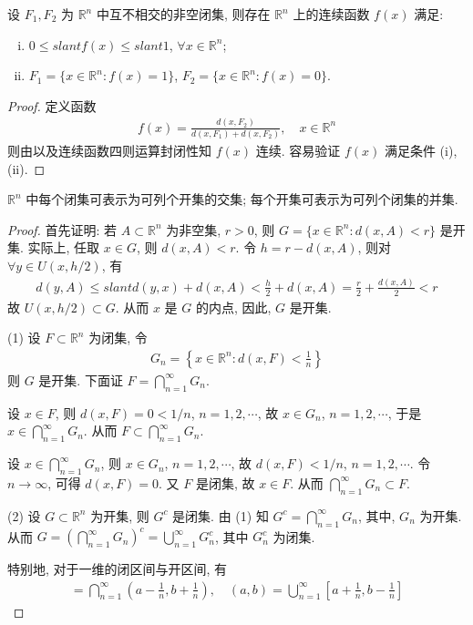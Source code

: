 \documentclass[../../main.tex]{subfiles}
\begin{document}
\begin{proposition}
设 $F_1, F_2$ 为 $\mathbb{R}^n$ 中互不相交的非空闭集, 则存在 $\mathbb{R}^n$ 上的连续函数 $f(x)$ 满足:
\begin{enumerate}[(i)]
\item $0 \leqslant slant f(x) \leqslant slant 1$, $\forall x \in \mathbb{R}^n$;
\item $F_1 = \{x \in \mathbb{R}^n : f(x) = 1\}$, $F_2 = \{x \in \mathbb{R}^n : f(x) = 0\}$.
\end{enumerate}
\end{proposition}
\begin{proof}
定义函数
\begin{align*}
f(x) = \frac{d(x, F_2)}{d(x, F_1) + d(x, F_2)}, \quad x \in \mathbb{R}^n
\end{align*}
则由以及连续函数四则运算封闭性知 $f(x)$ 连续. 容易验证 $f(x)$ 满足条件 (i), (ii).
\end{proof}
  
\begin{proposition}
$\mathbb{R}^n$ 中每个闭集可表示为可列个开集的交集; 每个开集可表示为可列个闭集的并集.
\end{proposition}
\begin{proof}
首先证明: 若 $A \subset \mathbb{R}^n$ 为非空集, $r > 0$, 则 $G = \{x \in \mathbb{R}^n : d(x, A) < r\}$ 是开集. 实际上, 任取 $x \in G$, 则 $d(x, A) < r$. 令 $h = r - d(x, A)$, 则对 $\forall y \in U(x, h/2)$, 有
\begin{align*}
d(y, A) \leqslant slant d(y, x) + d(x, A) < \frac{h}{2} + d(x, A) = \frac{r}{2} + \frac{d(x, A)}{2} < r
\end{align*}
故 $U(x, h/2) \subset G$. 从而 $x$ 是 $G$ 的内点, 因此, $G$ 是开集.

(1) 设 $F \subset \mathbb{R}^n$ 为闭集, 令
\begin{align*}
G_n = \left\{x \in \mathbb{R}^n : d(x, F) < \frac{1}{n}\right\}
\end{align*}
则 $G$ 是开集. 下面证 $F = \bigcap_{n = 1}^{\infty} G_n$.

设 $x \in F$, 则 $d(x, F) = 0 < 1/n$, $n = 1, 2, \cdots$, 故 $x \in G_n$, $n = 1, 2, \cdots$, 于是 $x \in \bigcap_{n = 1}^{\infty} G_n$. 从而 $F \subset \bigcap_{n = 1}^{\infty} G_n$.

设 $x \in \bigcap_{n = 1}^{\infty} G_n$, 则 $x \in G_n$, $n = 1, 2, \cdots$, 故 $d(x, F) < 1/n$, $n = 1, 2, \cdots$. 令 $n \to \infty$, 可得 $d(x, F) = 0$. 又 $F$ 是闭集, 故 $x \in F$. 从而 $\bigcap_{n = 1}^{\infty} G_n \subset F$.

(2) 设 $G \subset \mathbb{R}^n$ 为开集, 则 $G^c$ 是闭集. 由 (1) 知 $G^c = \bigcap_{n = 1}^{\infty} G_n$, 其中, $G_n$ 为开集. 从而 $G = \left(\bigcap_{n = 1}^{\infty} G_n\right)^c = \bigcup_{n = 1}^{\infty} G_n^c$, 其中 $G_n^c$ 为闭集.

特别地, 对于一维的闭区间与开区间, 有
\begin{align*}
[a, b] = \bigcap_{n = 1}^{\infty}\left(a - \frac{1}{n}, b + \frac{1}{n}\right), \quad (a, b) = \bigcup_{n = 1}^{\infty}\left[a + \frac{1}{n}, b - \frac{1}{n}\right]
\end{align*}
\end{proof}
\end{document}
